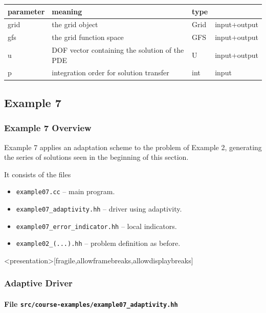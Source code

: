 \begin{tabular}{l|lll}
  parameter   & meaning                                          & type    &  \\
  \hline
  grid        & the grid object                                  & Grid    & input+output \\
  gfs         & the grid function space                          & GFS     & input+output \\
  u           & DOF vector containing the solution of the PDE    & U       & input+output \\
  p           & integration order for solution transfer          & int     & input \\
\end{tabular}



\subsection{Example 7}

\begin{frame}
  \frametitle{Example 7 Overview}

  Example 7 applies an adaptation scheme to the problem of Example 2, generating the series of solutions seen in the beginning of this section.

  It consists of the files
  \begin{itemize}
    \item \lstinline{example07.cc} -- main program.
    \item \lstinline{example07_adaptivity.hh} -- driver using adaptivity.
    \item \lstinline{example07_error_indicator.hh} -- local indicators.
    \item \lstinline{example02_(...).hh} -- problem definition as before.
  \end{itemize}
\end{frame}

\begin{frame}<presentation>[fragile,allowframebreaks,allowdisplaybreaks]
  \frametitle<presentation>{Adaptive Driver}
  \framesubtitle<presentation>{File \texttt{src/course-examples/example07\_adaptivity.hh}}
  
\end{frame}


